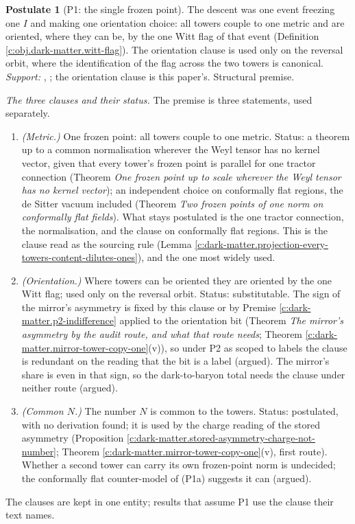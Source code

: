 \documentclass[11pt]{article}
\theoremstyle{definition}
\newtheorem{postulate}[theorem]{Postulate}
\theoremstyle{plain}
\newcommand{\changedmark}[2]{\marginpar{\raggedright\scriptsize\color{#1}#2}}
\begin{document}
\begin{postulate}[P1: the single frozen point]\label{c:dark-matter.p1-single-frozen-point}
\changedmark{BurntOrange}{changed since the deposit}
The descent was one event freezing one $I$ and making one orientation choice: all towers couple to one metric and are oriented, where they can be, by the one Witt flag of that event (Definition \ref{c:obj.dark-matter.witt-flag}). The orientation clause is used only on the reversal orbit, where the identification of the flag across the two towers is canonical. \emph{Support:} \cite[Thm.~4.7]{ButlerT6}, \cite[Obs.~7.4]{ButlerT12}; the orientation clause is this paper's. Structural premise.

\emph{The three clauses and their status.} The premise is three statements, used separately.
\begin{enumerate}
\item[(P1a)] \emph{(Metric.)} One frozen point: all towers couple to one metric. Status: a theorem up to a common normalisation wherever the Weyl tensor has no kernel vector, given that every tower's frozen point is parallel for one tractor connection (Theorem \emph{One frozen point up to scale wherever the Weyl tensor has no kernel vector}); an independent choice on conformally flat regions, the de Sitter vacuum included (Theorem \emph{Two frozen points of one norm on conformally flat fields}). What stays postulated is the one tractor connection, the normalisation, and the clause on conformally flat regions. This is the clause read as the sourcing rule (Lemma \ref{c:dark-matter.projection-every-towers-content-dilutes-ones}), and the one most widely used.
\item[(P1b)] \emph{(Orientation.)} Where towers can be oriented they are oriented by the one Witt flag; used only on the reversal orbit. Status: substitutable. The sign of the mirror's asymmetry is fixed by this clause or by Premise \ref{c:dark-matter.p2-indifference} applied to the orientation bit (Theorem \emph{The mirror's asymmetry by the audit route, and what that route needs}; Theorem \ref{c:dark-matter.mirror-tower-copy-one}(v)), so under P2 as scoped to labels the clause is redundant on the reading that the bit is a label (argued). The mirror's share is even in that sign, so the dark-to-baryon total needs the clause under neither route (argued).
\item[(P1c)] \emph{(Common $N$.)} The number $N$ is common to the towers. Status: postulated, with no derivation found; it is used by the charge reading of the stored asymmetry (Proposition \ref{c:dark-matter.stored-asymmetry-charge-not-number}; Theorem \ref{c:dark-matter.mirror-tower-copy-one}(v), first route). Whether a second tower can carry its own frozen-point norm is undecided; the conformally flat counter-model of (P1a) suggests it can (argued).
\end{enumerate}
The clauses are kept in one entity; results that assume P1 use the clause their text names.


\end{postulate}
\end{document}
